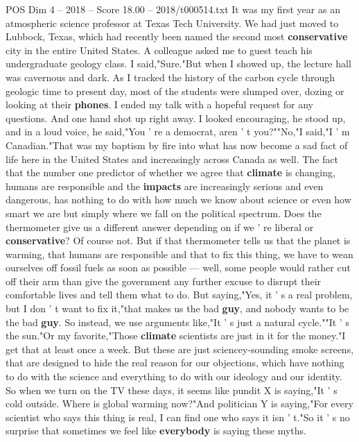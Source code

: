 \begin{textsample}{POS Dim 4 – 2018 – Score 18.00 – 2018/t000514.txt}  \label{ex:f4_pos_064}
It was my first year as an atmospheric science professor at Texas Tech University.
We had just moved to Lubbock, Texas, which had recently been named the second most \textbf{conservative} city in the entire United States.
A colleague asked me to guest teach his undergraduate geology class.
I said,"Sure."But when I showed up, the lecture hall was cavernous and dark.
As I tracked the history of the carbon cycle through geologic time to present day, most of the students were slumped over, dozing or looking at their \textbf{phones}.
I ended my talk with a hopeful request for any questions.
And one hand shot up right away.
I looked encouraging, he stood up, and in a loud voice, he said,"You ' re a democrat, aren ' t you?""No,"I said,"I ' m Canadian."That was my baptism by fire into what has now become a sad fact of life here in the United States and increasingly across Canada as well.
The fact that the number one predictor of whether we agree that \textbf{climate} is changing, humans are responsible and the \textbf{impacts} are increasingly serious and even dangerous, has nothing to do with how much we know about science or even how smart we are but simply where we fall on the political spectrum.
Does the thermometer give us a different answer depending on if we ' re liberal or \textbf{conservative}?
Of course not.
But if that thermometer tells us that the planet is warming, that humans are responsible and that to fix this thing, we have to wean ourselves off fossil fuels as soon as possible — well, some people would rather cut off their arm than give the government any further excuse to disrupt their comfortable lives and tell them what to do.
But saying,"Yes, it ' s a real problem, but I don ' t want to fix it,"that makes us the bad \textbf{guy}, and nobody wants to be the bad \textbf{guy}.
So instead, we use arguments like,"It ' s just a natural cycle.""It ' s the sun."Or my favorite,"Those \textbf{climate} scientists are just in it for the money."I get that at least once a week.
But these are just sciencey-sounding smoke screens, that are designed to hide the real reason for our objections, which have nothing to do with the science and everything to do with our ideology and our identity.
So when we turn on the TV these days, it seems like pundit X is saying,"It ' s cold outside.
Where is global warming now?"And politician Y is saying,"For every scientist who says this thing is real, I can find one who says it isn ' t."So it ' s no surprise that sometimes we feel like \textbf{everybody} is saying these myths.

\end{textsample}
